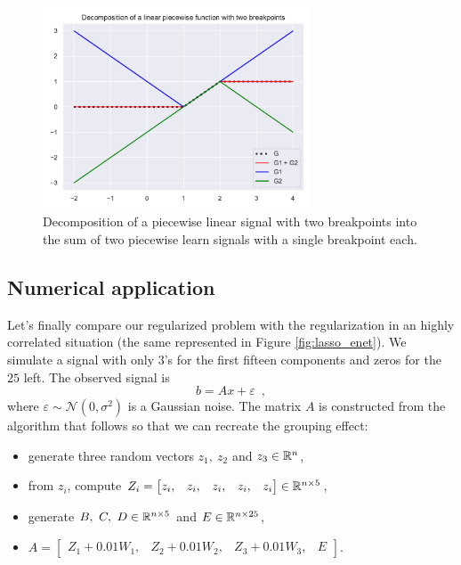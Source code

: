 \begin{figure}[H]
    \centering
    \includegraphics[height=6cm, trim={0cm 0Cm 0cm 1cm}, clip]{images/decomposition.pdf}
    \caption{Decomposition of a piecewise linear signal with two breakpoints into the sum of two piecewise learn signals with a single breakpoint each.}
    \label{fig:decomposition}
\end{figure}

\subsection{Numerical application}

Let's finally compare our regularized problem with the \enet
regularization in an highly correlated situation (the same represented in Figure \ref{fig:lasso_enet}).
We simulate a signal with only $3$'s for the first fifteen components and zeros for the $25$ left. The observed signal is 
\[ b = Ax + \varepsilon\enspace,\]
where $\varepsilon\sim\mathcal{N}(0,\sigma^2)$ is a Gaussian noise.
The matrix $A$ is constructed from the algorithm that follows so that we can recreate the grouping effect:
\begin{itemize}
\setlength{\arraycolsep}{1pt} %
    \item generate three random vectors $z_1,\ z_2$ and $z_3\in\mathbb{R}^n$,
    \item from $z_i$, compute $Z_i=\begin{bmatrix} z_i, & z_i, & z_i, & z_i, & z_i\end{bmatrix}\in\mathbb{R}^{n\times 5}$,
    \item generate $B,\ C,\ D\in\mathbb{R}^{n\times 5}$ and $E\in\mathbb{R}^{n\times 25}$,
    \item $A=\begin{bmatrix}Z_1 + 0.01 W_1, & Z_2 + 0.01 W_2, & Z_3 + 0.01 W_3, & E \end{bmatrix}$.
\end{itemize}

